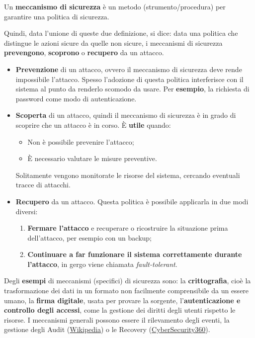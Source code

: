 \documentclass[a4paper]{article}
\begin{document}
	\noindent
	Un \textcolor{Red3}{\textbf{meccanismo di sicurezza}} è un metodo (strumento/procedura) per garantire una politica di sicurezza.\newline
	
	\noindent
	Quindi, data l'unione di queste due definizione, si dice: data una politica che distingue le azioni sicure da quelle non sicure, i meccanismi di sicurezza \textbf{prevengono}, \textbf{scoprono} o \textbf{recupero} da un attacco.
	\begin{itemize}
		\item \textbf{Prevenzione} di un attacco, ovvero il meccanismo di sicurezza deve rende impossibile l'attacco. Spesso l'adozione di questa politica interferisce con il sistema al punto da renderlo scomodo da usare. Per \textcolor{Green4}{\textbf{esempio}}, la richiesta di password come modo di autenticazione.
		
		\item \textbf{Scoperta} di un attacco, quindi il meccanismo di sicurezza è in grado di scoprire che un attacco è in corso. È \textbf{utile} quando:
		\begin{itemize}
			\item Non è possibile prevenire l'attacco;
			\item È necessario valutare le misure preventive.
		\end{itemize}
		Solitamente vengono monitorate le risorse del sistema, cercando eventuali tracce di attacchi.
		
		\item \textbf{Recupero} da un attacco. Questa politica è possibile applicarla in due modi diversi:
		\begin{enumerate}
			\item \textbf{Fermare l'attacco} e recuperare o ricostruire la situazione prima dell'attacco, per esempio con un backup;
			
			\item \textbf{Continuare a far funzionare il sistema correttamente durante l'attacco}, in gergo viene chiamata \emph{fault-tolerant}.
		\end{enumerate}
	\end{itemize}
	Degli \textcolor{Green4}{\textbf{esempi}} di meccanismi (specifici) di sicurezza sono: la \textbf{crittografia}, cioè la trasformazione dei dati in un formato non facilmente comprensibile da un essere umano, la \textbf{firma digitale}, usata per provare la sorgente, l'\textbf{autenticazione e controllo degli accessi}, come la gestione dei diritti degli utenti rispetto le risorse. I meccanismi generali possono essere il rilevamento degli eventi, la gestione degli Audit (\href{https://it.wikipedia.org/wiki/Audit}{Wikipedia}) o le Recovery (\href{https://www.cybersecurity360.it/soluzioni-aziendali/cyber-event-recovery-strutturare-un-piano-dazione-per-ripristinare-dati-sistemi-e-servizi/}{CyberSecurity360}).\newpage
	
\end{document}
